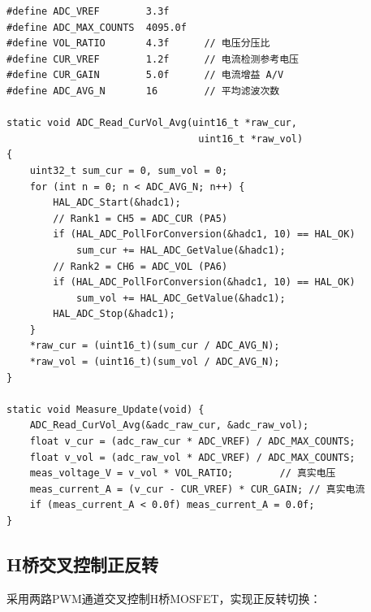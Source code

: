 \documentclass[12pt,a4paper]{ctexart}
\begin{document}
\begin{lstlisting}[style=cstyle, caption={ADC双通道序列采集 + 16次滑动平均滤波}]
#define ADC_VREF        3.3f
#define ADC_MAX_COUNTS  4095.0f
#define VOL_RATIO       4.3f      // 电压分压比
#define CUR_VREF        1.2f      // 电流检测参考电压
#define CUR_GAIN        5.0f      // 电流增益 A/V
#define ADC_AVG_N       16        // 平均滤波次数

static void ADC_Read_CurVol_Avg(uint16_t *raw_cur,
                                 uint16_t *raw_vol)
{
    uint32_t sum_cur = 0, sum_vol = 0;
    for (int n = 0; n < ADC_AVG_N; n++) {
        HAL_ADC_Start(&hadc1);
        // Rank1 = CH5 = ADC_CUR (PA5)
        if (HAL_ADC_PollForConversion(&hadc1, 10) == HAL_OK)
            sum_cur += HAL_ADC_GetValue(&hadc1);
        // Rank2 = CH6 = ADC_VOL (PA6)
        if (HAL_ADC_PollForConversion(&hadc1, 10) == HAL_OK)
            sum_vol += HAL_ADC_GetValue(&hadc1);
        HAL_ADC_Stop(&hadc1);
    }
    *raw_cur = (uint16_t)(sum_cur / ADC_AVG_N);
    *raw_vol = (uint16_t)(sum_vol / ADC_AVG_N);
}

static void Measure_Update(void) {
    ADC_Read_CurVol_Avg(&adc_raw_cur, &adc_raw_vol);
    float v_cur = (adc_raw_cur * ADC_VREF) / ADC_MAX_COUNTS;
    float v_vol = (adc_raw_vol * ADC_VREF) / ADC_MAX_COUNTS;
    meas_voltage_V = v_vol * VOL_RATIO;        // 真实电压
    meas_current_A = (v_cur - CUR_VREF) * CUR_GAIN; // 真实电流
    if (meas_current_A < 0.0f) meas_current_A = 0.0f;
}
\end{lstlisting}

\subsection{H桥交叉控制正反转}

采用两路PWM通道交叉控制H桥MOSFET，实现正反转切换：
\end{document}
